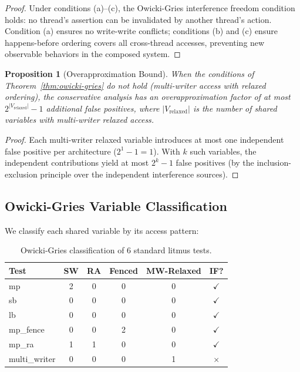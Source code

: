 \documentclass[11pt]{article}
\newcommand{\cmark}{$\checkmark$}
\newcommand{\xmark}{$\times$}
\newtheorem{proposition}[theorem]{Proposition}
\begin{document}
\begin{proof}
Under conditions (a)--(c), the Owicki-Gries interference
freedom condition holds: no thread's assertion can be
invalidated by another thread's action. Condition (a)
ensures no write-write conflicts; conditions (b) and (c)
ensure happens-before ordering covers all cross-thread
accesses, preventing new observable behaviors in the
composed system.
\end{proof}

\begin{proposition}[Overapproximation Bound]
\label{prop:overapprox}
When the conditions of Theorem~\ref{thm:owicki-gries} do not
hold (multi-writer access with relaxed ordering), the conservative
analysis has an overapproximation factor of at most
$2^{|V_{\text{relaxed}}|} - 1$ additional false positives, where
$|V_{\text{relaxed}}|$ is the number of shared variables with
multi-writer relaxed access.
\end{proposition}

\begin{proof}
Each multi-writer relaxed variable introduces at most one
independent false positive per architecture ($2^1 - 1 = 1$).
With $k$ such variables, the independent contributions
yield at most $2^k - 1$ false positives (by the inclusion-exclusion
principle over the independent interference sources).
\end{proof}

\subsection{Owicki-Gries Variable Classification}

We classify each shared variable by its access pattern:

\begin{table}[ht]
\centering
\caption{Owicki-Gries classification of 6 standard litmus tests.}
\label{tab:og-classify}
\small
\begin{tabular}{lccccc}
\toprule
\textbf{Test} & \textbf{SW} & \textbf{RA} & \textbf{Fenced} &
\textbf{MW-Relaxed} & \textbf{IF?} \\
\midrule
mp & 2 & 0 & 0 & 0 & \cmark \\
sb & 0 & 0 & 0 & 0 & \cmark \\
lb & 0 & 0 & 0 & 0 & \cmark \\
mp\_fence & 0 & 0 & 2 & 0 & \cmark \\
mp\_ra & 1 & 1 & 0 & 0 & \cmark \\
multi\_writer & 0 & 0 & 0 & 1 & \xmark \\
\bottomrule
\end{tabular}
\end{table}
\end{document}
